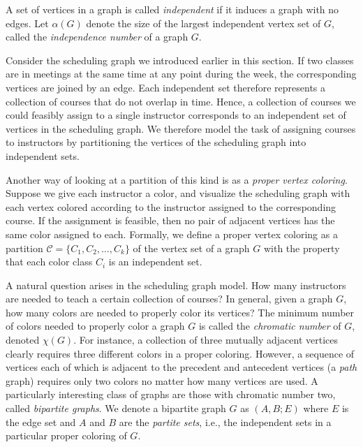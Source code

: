 A set of vertices in a graph is called {\it independent} if it induces a graph with no edges.  Let $\alpha(G)$ denote the size of the largest independent vertex set of $G$, called the {\it independence number} of a graph $G$.  

Consider the scheduling graph we introduced earlier in this section.  If two classes are in meetings at the same time at any point during the week, the corresponding vertices are joined by an edge.  Each independent set therefore represents a collection of courses that do not overlap in time. Hence, a collection of courses we could feasibly assign to a single instructor corresponds to an independent set of vertices in the scheduling graph.  We therefore model the task of assigning courses to instructors by partitioning the vertices of the scheduling graph into independent sets.

Another way of looking at a partition of this kind is as a {\it proper vertex coloring}.  Suppose we give each instructor a color, and visualize the scheduling graph with each vertex colored according to the instructor assigned to the corresponding course.  If the assignment is feasible, then no pair of adjacent vertices has the same color assigned to each.  Formally, we define a proper vertex coloring as a partition $\mathcal{C} = \{C_1, C_2, \ldots, C_k\}$ of the vertex set of a graph $G$ with the property that each color class $C_i$ is an independent set.

A natural question arises in the scheduling graph model. How many instructors are needed to teach a certain collection of courses?  In general, given a graph $G$, how many colors are needed to properly color its vertices?   
The minimum number of colors needed to properly color a graph $G$ is called the {\it chromatic number} of $G$, denoted $\chi(G)$.  For instance, a collection of three mutually adjacent vertices clearly requires three different colors in a proper coloring.  However, a sequence of vertices each of which is adjacent to the precedent and antecedent vertices (a {\it path} graph) requires only two colors no matter how many vertices are used.   A particularly interesting class of graphs are those with chromatic number two, called {\it bipartite graphs}.  We denote a bipartite graph $G$ as $(A,B; E)$ where $E$ is the edge set and $A$ and $B$ are the {\it partite sets}, i.e., the independent sets in a particular proper coloring of $G$.

